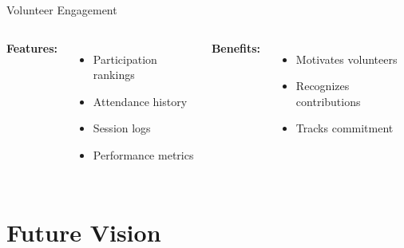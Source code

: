 \documentclass[aspectratio=169]{beamer}
\begin{document}
\begin{frame}{Volunteer Engagement}
    \begin{columns}
        \centering
        
        \textbf{Features:}
        \begin{itemize}
            \item Participation rankings
            \item Attendance history
            \item Session logs
            \item Performance metrics
        \end{itemize}
        
        \vspace{1em}
        
        \textbf{Benefits:}
        \begin{itemize}
            \item Motivates volunteers
            \item Recognizes contributions
            \item Tracks commitment
        \end{itemize}
    \end{columns}
\end{frame}

\section{Future Vision}
\end{document}
